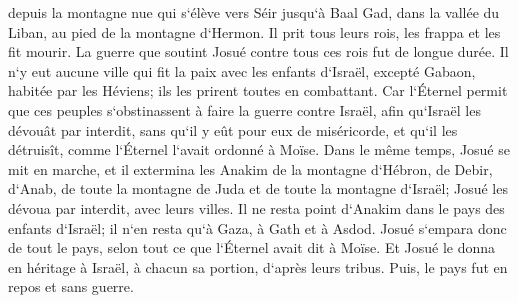 \verse depuis la montagne nue qui s`élève vers Séir jusqu`à Baal Gad, dans la vallée du Liban, au pied de la montagne d`Hermon. Il prit tous leurs rois, les frappa et les fit mourir. 
\verse La guerre que soutint Josué contre tous ces rois fut de longue durée. 
\verse Il n`y eut aucune ville qui fit la paix avec les enfants d`Israël, excepté Gabaon, habitée par les Héviens; ils les prirent toutes en combattant. 
\verse Car l`Éternel permit que ces peuples s`obstinassent à faire la guerre contre Israël, afin qu`Israël les dévouât par interdit, sans qu`il y eût pour eux de miséricorde, et qu`il les détruisît, comme l`Éternel l`avait ordonné à Moïse. 
\verse Dans le même temps, Josué se mit en marche, et il extermina les Anakim de la montagne d`Hébron, de Debir, d`Anab, de toute la montagne de Juda et de toute la montagne d`Israël; Josué les dévoua par interdit, avec leurs villes. 
\verse Il ne resta point d`Anakim dans le pays des enfants d`Israël; il n`en resta qu`à Gaza, à Gath et à Asdod. 
\verse Josué s`empara donc de tout le pays, selon tout ce que l`Éternel avait dit à Moïse. Et Josué le donna en héritage à Israël, à chacun sa portion, d`après leurs tribus. Puis, le pays fut en repos et sans guerre. 

\chapter{}

